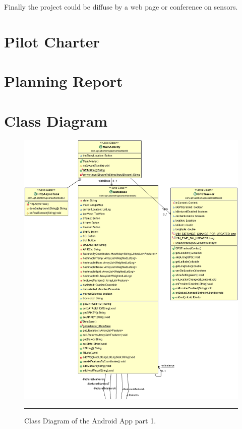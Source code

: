 \documentclass[12pt, a4paper,twoside]{tesi_upf}
\begin{document}
  Finally the project could be diffuse by a web page or conference on sensors.


{}
\cleardoublepage

\appendix
\label{Appendixes}

	\chapter{Pilot Charter}
	\label{PilotCharter}
  	
	
	\chapter{Planning Report}
	\label{PlanningReport}
  	
  	
  \chapter{Class Diagram}
	\clearpage
		\begin{figure}[H]
      \centering
        \includegraphics[scale=0.5]{./Figures/ClassDiagram1_1.png}
      \rule{35em}{0.5pt}
      \caption[Class Diagram of the Android App part 1]{Class Diagram of the Android App part 1.}
      \label{fig:ClassDiagram1}
    \end{figure}
		
\end{document}
